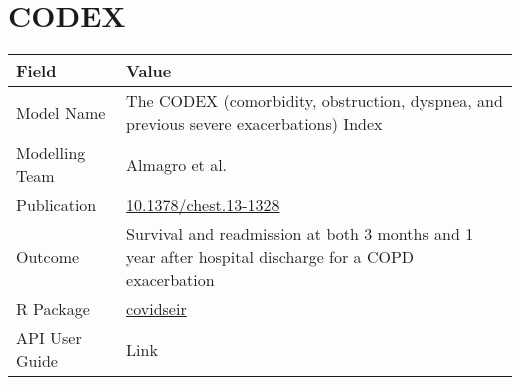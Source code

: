 \documentclass[
]{book}
\begin{document}
\hypertarget{codex}{%
\chapter{CODEX}\label{codex}}

\begin{longtable}[]{@{}ll@{}}
\toprule
\begin{minipage}[b]{0.45\columnwidth}\raggedright
Field\strut
\end{minipage} & \begin{minipage}[b]{0.49\columnwidth}\raggedright
Value\strut
\end{minipage}\tabularnewline
\midrule
\endhead
\begin{minipage}[t]{0.45\columnwidth}\raggedright
Model Name\strut
\end{minipage} & \begin{minipage}[t]{0.49\columnwidth}\raggedright
The CODEX (comorbidity, obstruction, dyspnea, and previous severe exacerbations) Index\strut
\end{minipage}\tabularnewline
\begin{minipage}[t]{0.45\columnwidth}\raggedright
Modelling Team\strut
\end{minipage} & \begin{minipage}[t]{0.49\columnwidth}\raggedright
Almagro et al.\strut
\end{minipage}\tabularnewline
\begin{minipage}[t]{0.45\columnwidth}\raggedright
Publication\strut
\end{minipage} & \begin{minipage}[t]{0.49\columnwidth}\raggedright
\href{https://doi.org/10.1378/chest.13-1328}{10.1378/chest.13-1328}\strut
\end{minipage}\tabularnewline
\begin{minipage}[t]{0.45\columnwidth}\raggedright
Outcome\strut
\end{minipage} & \begin{minipage}[t]{0.49\columnwidth}\raggedright
Survival and readmission at both 3 months and 1 year after hospital discharge for a COPD exacerbation\strut
\end{minipage}\tabularnewline
\begin{minipage}[t]{0.45\columnwidth}\raggedright
R Package\strut
\end{minipage} & \begin{minipage}[t]{0.49\columnwidth}\raggedright
\href{https://github.com/resplab/codexcopd}{covidseir}\strut
\end{minipage}\tabularnewline
\begin{minipage}[t]{0.45\columnwidth}\raggedright
API User Guide\strut
\end{minipage} & \begin{minipage}[t]{0.49\columnwidth}\raggedright
Link\strut
\end{minipage}\tabularnewline
\bottomrule
\end{longtable}
\end{document}

